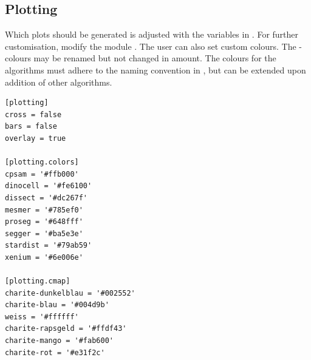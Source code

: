 \subsection*{Plotting}
Which plots should be generated is adjusted with the variables in \inlinecode{[plotting]}. For further customisation, modify the module . The user can also set custom colours. The -colours may be renamed but not changed in amount. The colours for the algorithms must adhere to the naming convention in \inlinecode{[methods]}, but can be extended upon addition of other algorithms.
\begin{lstlisting}[style=customIni]
[plotting]
cross = false
bars = false
overlay = true

[plotting.colors]
cpsam = '#ffb000'
dinocell = '#fe6100'
dissect = '#dc267f'
mesmer = '#785ef0'
proseg = '#648fff'
segger = '#ba5e3e'
stardist = '#79ab59'
xenium = '#6e006e'

[plotting.cmap]
charite-dunkelblau = '#002552'
charite-blau = '#004d9b'
weiss = '#ffffff'
charite-rapsgeld = '#ffdf43'
charite-mango = '#fab600'
charite-rot = '#e31f2c'
\end{lstlisting}
% 